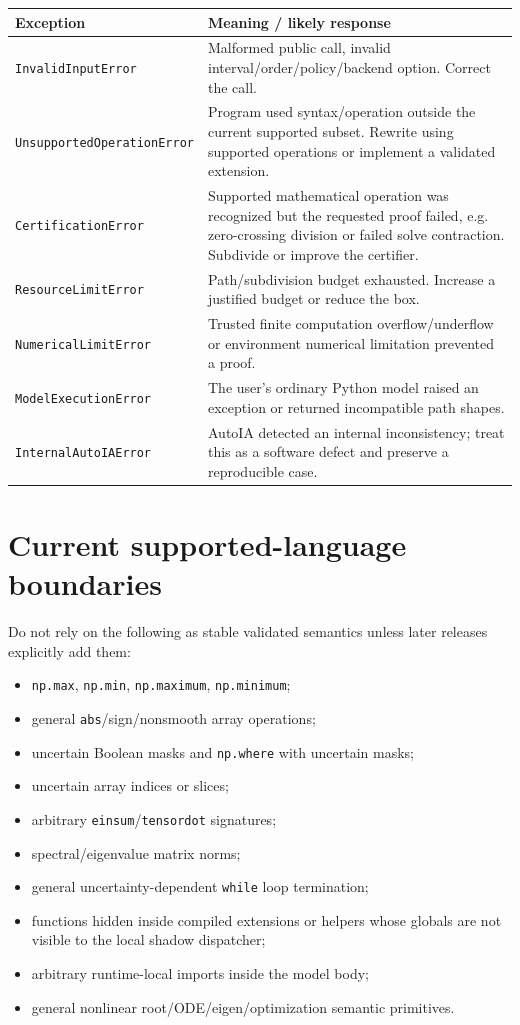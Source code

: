 \documentclass[11pt]{article}
\begin{document}
\begin{longtable}{p{}p{}}
\toprule
Exception & Meaning / likely response \\
\midrule
\endhead
\texttt{InvalidInputError} & Malformed public call, invalid interval/order/policy/backend option.  Correct the call. \\
\texttt{UnsupportedOperationError} & Program used syntax/operation outside the current supported subset.  Rewrite using supported operations or implement a validated extension. \\
\texttt{CertificationError} & Supported mathematical operation was recognized but the requested proof failed, e.g. zero-crossing division or failed solve contraction.  Subdivide or improve the certifier. \\
\texttt{ResourceLimitError} & Path/subdivision budget exhausted.  Increase a justified budget or reduce the box. \\
\texttt{NumericalLimitError} & Trusted finite computation overflow/underflow or environment numerical limitation prevented a proof. \\
\texttt{ModelExecutionError} & The user's ordinary Python model raised an exception or returned incompatible path shapes. \\
\texttt{InternalAutoIAError} & AutoIA detected an internal inconsistency; treat this as a software defect and preserve a reproducible case. \\
\bottomrule
\end{longtable}

\section{Current supported-language boundaries}

Do not rely on the following as stable validated semantics unless later releases
explicitly add them:
\begin{itemize}[leftmargin=*]
\item \texttt{np.max}, \texttt{np.min}, \texttt{np.maximum}, \texttt{np.minimum};
\item general \texttt{abs}/sign/nonsmooth array operations;
\item uncertain Boolean masks and \texttt{np.where} with uncertain masks;
\item uncertain array indices or slices;
\item arbitrary \texttt{einsum}/\texttt{tensordot} signatures;
\item spectral/eigenvalue matrix norms;
\item general uncertainty-dependent \texttt{while} loop termination;
\item functions hidden inside compiled extensions or helpers whose globals are not
visible to the local shadow dispatcher;
\item arbitrary runtime-local imports inside the model body;
\item general nonlinear root/ODE/eigen/optimization semantic primitives.
\end{itemize}
\end{document}
